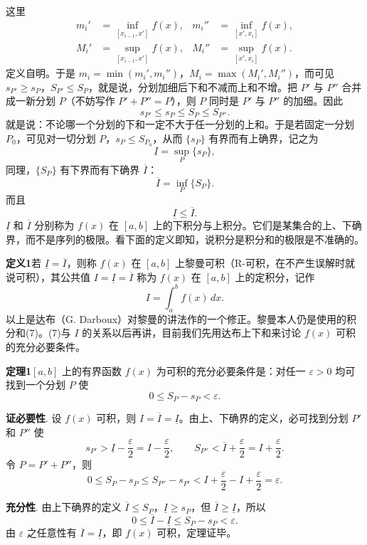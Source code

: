 这里
\begin{align*}
 m_i'&=\inf_{[x_{i-1},x']}f(x), & m_i''&=\inf_{[x',x_i]}f(x),\\
 M_i'&=\sup_{[x_{i-1},x']}f(x), & M_i''&=\sup_{[x',x_i]}f(x).
\end{align*}
定义自明。于是 $m_i=\min(m_i',m_i'')$，$M_i=\max(M_i',M_i'')$，而可见 $s_{P'}\ge s_P$，$S_{P'}\le S_P$，就是说，分划加细后下和不减而上和不增。把 $P'$ 与 $P''$ 合并成一新分划 $P$（不妨写作 $P'+P''=P$），则 $P$ 同时是 $P'$ 与 $P''$ 的加细。因此
\begin{equation}
 s_{P'}\le s_P\le S_P\le S_{P''}.
 \tag{10}
\end{equation}
就是说：不论哪一个分划的下和一定不大于任一分划的上和。于是若固定一分划 $P_0$，可见对一切分划 $P$，$s_P\le S_{P_0}$，从而 $\{s_P\}$ 有界而有上确界，记之为
\[
 \underline I=\sup_P\{s_P\},
\]
同理，$\{S_P\}$ 有下界而有下确界 $\overline I$：
\[
 \overline I=\inf_P\{S_P\}.
\]
而且
\[
 \underline I\le\overline I.
\]
$\underline I$ 和 $\overline I$ 分别称为 $f(x)$ 在 $[a,b]$ 上的下积分与上积分。它们是某集合的上、下确界，而不是序列的极限。看下面的定义即知，说积分是积分和的极限是不准确的。

\noindent\textbf{定义1}\quad 若 $\underline I=\overline I$，则称 $f(x)$ 在 $[a,b]$ 上黎曼可积（R-可积，在不产生误解时就说可积），其公共值 $I=\underline I=\overline I$ 称为 $f(x)$ 在 $[a,b]$ 上的定积分，记作
\begin{equation}
 I=\int_a^b f(x)\,dx.
 \tag{11}
\end{equation}
以上是达布（G. Darboux）对黎曼的讲法作的一个修正。黎曼本人仍是使用的积分和(7)。(7)与 $I$ 的关系以后再讲，目前我们先用达布上下和来讨论 $f(x)$ 可积的充分必要条件。

\noindent\textbf{定理1}\quad $[a,b]$ 上的有界函数 $f(x)$ 为可积的充分必要条件是：对任一 $\varepsilon>0$ 均可找到一个分划 $P$ 使
\[
 0\le S_P-s_P<\varepsilon.
\]

\noindent\textbf{证}\quad \textbf{必要性}. 设 $f(x)$ 可积，则 $I=\overline I=\underline I$。由上、下确界的定义，必可找到分划 $P'$ 和 $P''$ 使
\[
 s_{P'}>\underline I-\frac\varepsilon2=I-\frac\varepsilon2,
 \qquad
 S_{P''}<\overline I+\frac\varepsilon2=I+\frac\varepsilon2.
\]
令 $P=P'+P''$，则
\[
 0\le S_P-s_P\le S_{P''}-s_{P'}<I+\frac\varepsilon2-I+\frac\varepsilon2=\varepsilon.
\]

\textbf{充分性}. 由上下确界的定义 $\overline I\le S_P$，$\underline I\ge s_P$，但 $\overline I\ge\underline I$，所以
\[
 0\le\overline I-\underline I\le S_P-s_P<\varepsilon.
\]
由 $\varepsilon$ 之任意性有 $\overline I=\underline I$，即 $f(x)$ 可积，定理证毕。

